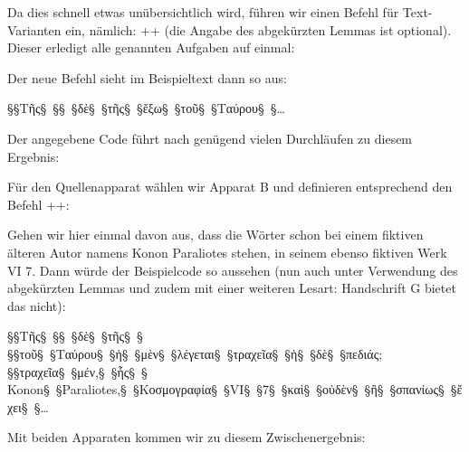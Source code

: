 Da dies schnell etwas unübersichtlich wird, führen wir einen Befehl für Text-Varianten ein, 
nämlich: ++ (die Angabe des abgekürzten Lemmas ist optional). Dieser erledigt alle genannten Aufgaben auf einmal:

\begin{lfgwcode}{}
\newcommand\vari[3][]{%
  \edtext{#2}{\if$#1$#2\else\lemma{#1}\fi
    \Cfootnote{#3}}}
\end{lfgwcode}

Der neue Befehl sieht im Beispieltext dann so aus:

\begin{lfgwcode}{}
§\null§Τῆς§~§§~§δὲ§~§τῆς§~§ἔξω§~§τοῦ§~§Ταύρου§~§\dots{}
\end{lfgwcode}

Der angegebene Code führt nach genügend vielen Durchläufen zu diesem Ergebnis:

\begin{reledmacbsp}{\bsplineenum}
\end{reledmacbsp}

Für den Quellenapparat wählen wir Apparat B und definieren entsprechend den Befehl ++:

\begin{lfgwcode}{}
\newcommand\quell[3][]{%
  \edtext{#2}{\if$#1$#2\else\lemma{#1}\fi
    \Bfootnote{#3}}}
\end{lfgwcode}

Gehen wir hier einmal davon aus, dass die Wörter  schon bei einem fiktiven 
älteren Autor namens Konon Paraliotes stehen, in seinem ebenso fiktiven Werk  VI 7. Dann würde der Beispielcode so aussehen (nun auch unter Verwendung des abgekürzten 
Lemmas und zudem mit einer weiteren Lesart: Handschrift G bietet das  nicht):

\begin{lfgwcode}{}
§\null§Τῆς§~§§~§δὲ§~§τῆς§~§
§\null§τοῦ§~§Ταύρου§~§ἡ§~§μὲν§~§λέγεται§~§τραχεῖα§~§ἡ§~§δὲ§~§πεδιάς;
§\null§τραχεῖα§~§μέν,§~§ἧς§~§%
{Konon§~§Paraliotes,§~§Κοσμογραφία§~§VI§~§7}§~§καὶ§~§οὐδὲν§~§ἢ§~§σπανίως§~§ἔχει§~§\dots{}
\end{lfgwcode}

Mit beiden Apparaten kommen wir zu diesem Zwischenergebnis:


